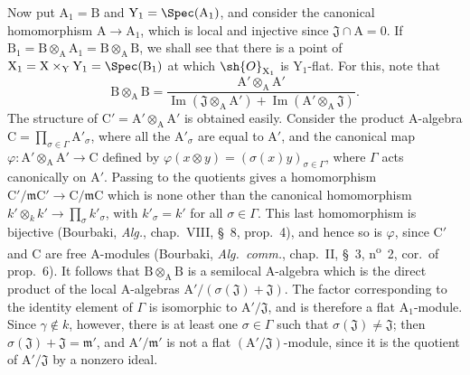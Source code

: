 \begin{env}[11.7.1]
Now put $\mathrm{A}_1=\mathrm{B}$ and $\mathrm{Y}_1=\Spec(\mathrm{A}_1)$, and consider the canonical homomorphism $\mathrm{A}\to\mathrm{A}_1$, which is local and injective since $\mathfrak{J}\cap\mathrm{A}=0$. If $\mathrm{B}_1=\mathrm{B}\otimes_\mathrm{A}\mathrm{A}_1=\mathrm{B}\otimes_\mathrm{A}\mathrm{B}$, we shall see that there is a point of $\mathrm{X}_1=\mathrm{X}\times_\mathrm{Y}\mathrm{Y}_1=\Spec(\mathrm{B}_1)$ at which $\sh{O}_{\mathrm{X}_1}$ is $\mathrm{Y}_1$-flat.
For this, note that
\[
\mathrm{B}\otimes_\mathrm{A}\mathrm{B}
=\frac{\mathrm{A}'\otimes_\mathrm{A}\mathrm{A}'}
{\operatorname{Im}(\mathfrak{J}\otimes_\mathrm{A}\mathrm{A}')+\operatorname{Im}(\mathrm{A}'\otimes_\mathrm{A}\mathfrak{J})}.
\]
The structure of $\mathrm{C}'=\mathrm{A}'\otimes_\mathrm{A}\mathrm{A}'$ is obtained easily. Consider the product $\mathrm{A}$-algebra $\mathrm{C}=\prod_{\sigma\in\Gamma}\mathrm{A}'_\sigma$, where all the $\mathrm{A}'_\sigma$ are equal to $\mathrm{A}'$, and the canonical map $\varphi:\mathrm{A}'\otimes_\mathrm{A}\mathrm{A}'\to\mathrm{C}$ defined by $\varphi(x\otimes y)=(\sigma(x)y)_{\sigma\in\Gamma}$, where $\Gamma$ acts canonically on $\mathrm{A}'$. Passing to the quotients gives a homomorphism $\mathrm{C}'/\mathfrak{m}\mathrm{C}'\to\mathrm{C}/\mathfrak{m}\mathrm{C}$ which is none other than the canonical homomorphism $k'\otimes_k k'\to\prod_\sigma k'_\sigma$, with $k'_\sigma=k'$ for all $\sigma\in\Gamma$. This last homomorphism is bijective (Bourbaki, \emph{Alg.}, chap.~VIII, \S~8, prop.~4), and hence so is $\varphi$, since $\mathrm{C}'$ and $\mathrm{C}$ are free $\mathrm{A}$-modules (Bourbaki, \emph{Alg.\ comm.}, chap.~II, \S~3, n\textsuperscript{o}~2, cor.~of prop.~6).
It follows that $\mathrm{B}\otimes_\mathrm{A}\mathrm{B}$ is a semilocal $\mathrm{A}$-algebra which is the direct product of the local $\mathrm{A}$-algebras $\mathrm{A}'/(\sigma(\mathfrak{J})+\mathfrak{J})$. The factor corresponding to the identity element of $\Gamma$ is isomorphic to $\mathrm{A}'/\mathfrak{J}$, and is therefore a flat $\mathrm{A}_1$-module. Since $\gamma\notin k$, however, there is at least one $\sigma\in\Gamma$ such that $\sigma(\mathfrak{J})\ne\mathfrak{J}$; then $\sigma(\mathfrak{J})+\mathfrak{J}=\mathfrak{m}'$, and $\mathrm{A}'/\mathfrak{m}'$ is not a flat $(\mathrm{A}'/\mathfrak{J})$-module, since it is the quotient of $\mathrm{A}'/\mathfrak{J}$ by a nonzero ideal.
\end{env}

